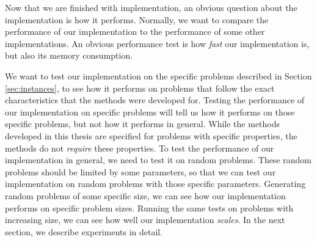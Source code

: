 Now that we are finished with implementation, an obvious question about the
implementation is how it performs. Normally, we want to compare the performance
of our implementation to the performance of some other implementations.
An obvious performance test is how \emph{fast} our implementation is, but also
its memory consumption.

We want to test our implementation on the specific problems described in
Section \ref{sec:instances}, to see how it performs on problems that follow
the exact characteristics that the methods were developed for.
Testing the performance of our implementation on specific problems will tell us
how it performs on those specific problems, but not how it performs in general.
While the methods developed in this thesis are specified for problems with
specific properties, the methods do not \emph{require} these properties.
To test the performance of our implementation in general, we need to test it
on random problems.
These random problems should be limited by some parameters, so that we can test
our implementation on random problems with those specific parameters.
Generating random problems of some specific size, we can see how our
implementation performs on specific problem sizes. Running the same
tests on problems with increasing size, we can see how well our implementation
\emph{scales}. In the next section, we describe experiments in detail.
